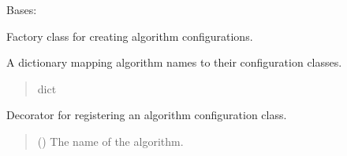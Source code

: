 \documentclass[letterpaper,10pt,english]{sphinxmanual}
\begin{document}
\begin{fulllineitems}
\label{\detokenize{application.factories:application.factories.AlgorithmFactory.AlgorithmFactory}}
\pysigstartsignatures
{}
\pysigstopsignatures
\sphinxAtStartPar
Bases: 

\sphinxAtStartPar
Factory class for creating algorithm configurations.

\begin{fulllineitems}
\label{\detokenize{application.factories:application.factories.AlgorithmFactory.AlgorithmFactory.algorithm_config}}
\pysigstartsignatures
{}
\pysigstopsignatures
\sphinxAtStartPar
A dictionary mapping algorithm names to their configuration classes.
\begin{quote}\begin{description}
\sphinxAtStartPar
dict

\end{description}\end{quote}

\end{fulllineitems}


\begin{fulllineitems}
\label{\detokenize{application.factories:application.factories.AlgorithmFactory.AlgorithmFactory.Configurator_for}}
\pysigstartsignatures
{}
\pysigstopsignatures
\sphinxAtStartPar
Decorator for registering an algorithm configuration class.
\begin{quote}\begin{description}
\sphinxAtStartPar
{} () \textendash{} The name of the algorithm.


\end{description}
\end{quote}
\end{fulllineitems}
\end{fulllineitems}
\end{document}
